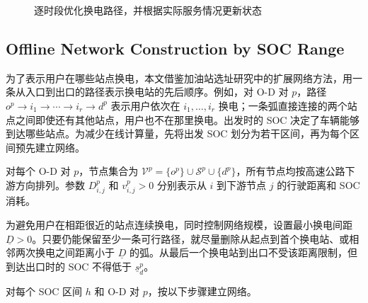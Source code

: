 \documentclass[12pt,a4paper,UTF8]{ctexart}
\begin{document}
\begin{figure}[!htbp]
  \centering
  \caption{逐时段优化换电路径，并根据实际服务情况更新状态}
  \label{fig:rolling_horizon}
\end{figure}


\subsection{Offline Network Construction by SOC Range}

为了表示用户在哪些站点换电，本文借鉴加油站选址研究中的扩展网络方法，用一条从入口到出口的路径表示换电站的先后顺序。例如，对 O-D 对 $p$，路径
$o^p\rightarrow i_1\rightarrow\cdots\rightarrow i_r\rightarrow d^p$ 表示用户依次在 $i_1,\ldots,i_r$ 换电；一条弧直接连接的两个站点之间即使还有其他站点，用户也不在那里换电。出发时的 SOC 决定了车辆能够到达哪些站点。为减少在线计算量，先将出发 SOC 划分为若干区间，再为每个区间预先建立网络。

对每个 O-D 对 $p$，节点集合为
$\mathcal V^p=\{o^p\}\cup\mathcal S^p\cup\{d^p\}$，所有节点均按高速公路下游方向排列。参数 $D_{i,j}^p$ 和 $v_{i,j}^p>0$ 分别表示从 $i$ 到下游节点 $j$ 的行驶距离和 SOC 消耗。

为避免用户在相距很近的站点连续换电，同时控制网络规模，设置最小换电间距 $\underline D>0$。只要仍能保留至少一条可行路径，就尽量删除从起点到首个换电站、或相邻两次换电之间距离小于 $\underline D$ 的弧。从最后一个换电站到出口不受该距离限制，但到达出口时的 SOC 不得低于 $\underline s_d^p$。

对每个 SOC 区间 $h$ 和 O-D 对 $p$，按以下步骤建立网络。
\end{document}
